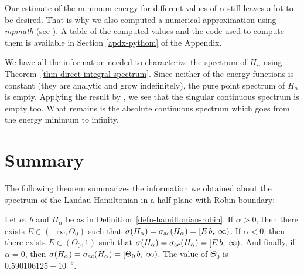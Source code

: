 Our estimate of the minimum energy for different values of $\alpha$ still leaves a lot to be desired. That is why we also computed a numerical approximation using \textit{mpmath} (see \cite{mpmath}). A table of the computed values and the code used to compute them is available in Section \ref{apdx-pythom} of the Appendix.

We have all the information needed to characterize the spectrum of $H_\alpha$ using Theorem~\ref{thm-direct-integral-spectrum}. Since neither of the energy functions is constant (they are analytic and grow indefinitely), the pure point spectrum of $H_\alpha$ is empty. Applying the result by \cite{Filonov2006}, we see that the singular continuous spectrum is empty too. What remains is the absolute continuous spectrum which goes from the energy minimum to infinity.

\section{Summary}
The following theorem summarizes the information we obtained about the spectrum of the Landau Hamiltonian in a half-plane with Robin boundary:
\begin{thm}
    Let $\alpha, \, b$ and $H_\alpha$ be as in Definition~\ref{defn-hamiltonian-robin}. If $\alpha > 0$, then there exists $E \in (-\infty, \Theta_0)$ such that $ \sigma(H_\alpha) = \sigma_{\mathrm{ac}}(H_\alpha) = [E \, b, \; \infty )$.
    If $\alpha < 0$, then there exists $E \in (\Theta_0, 1)$ such that $\sigma(H_\alpha) = \sigma_{\mathrm{ac}}(H_\alpha) = [E \, b, \; \infty )$.
    And finally, if $\alpha = 0$, then $\sigma(H_\alpha) = \sigma_{\mathrm{ac}}(H_\alpha) = [\Theta_0 \, b, \; \infty )$. The value of $\Theta_0$ is $0.590106125 \pm 10^{-9}$.
\end{thm}


